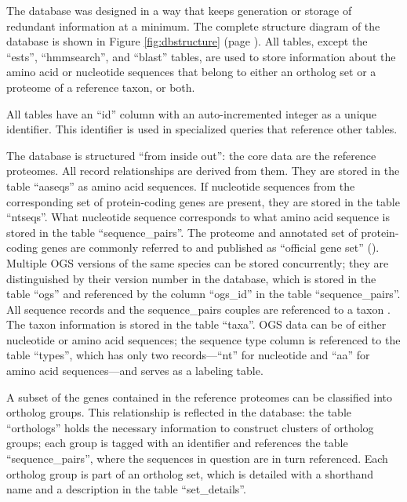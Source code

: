 \label{sec:database-structure}
The database was designed in a way that keeps
generation or storage of redundant information at a minimum. The complete
structure diagram of the database is shown in Figure \ref{fig:dbstructure} (page
\pageref{fig:dbstructure}). All tables, except the ``ests'', ``hmmsearch'', and
``blast'' tables, are used to store information about the amino acid or
nucleotide sequences that belong to either an ortholog set or a proteome of a
reference taxon, or both. 

All tables have an ``id'' column with an auto-incremented integer as a unique
identifier. This identifier is used in specialized queries that reference other
tables. 

The database is structured ``from inside out'': the core data are the reference
proteomes. All record relationships are derived from them. They are stored in
the table ``aaseqs'' as amino acid sequences. If nucleotide sequences from the
corresponding set of protein-coding genes are present, they are stored in the
table ``ntseqs''. What nucleotide sequence corresponds to what amino acid
sequence is stored in the table ``sequence\_pairs''. The proteome and annotated
set of protein-coding genes are commonly referred to and published as ``official
gene set'' ().  Multiple OGS versions of
the same species can be stored concurrently; they are distinguished by their
version number in the database, which is stored in the table ``ogs'' and
referenced by the column ``ogs\_id'' in the table ``sequence\_pairs''.  All
sequence records and the sequence\_pairs couples are referenced to a taxon
. The taxon information is stored in the table
``taxa''.  OGS data can be of either nucleotide or amino acid sequences; the
sequence type column is referenced to the table ``types'', which has only two
records---``nt'' for nucleotide and ``aa'' for amino acid sequences---and serves
as a labeling table.

A subset of the genes contained in the reference proteomes can be classified
into ortholog groups. This relationship is reflected in the database: the table
``orthologs'' holds the necessary information to construct clusters of ortholog
groups; each group is tagged with an identifier and references the table
``sequence\_pairs'', where the sequences in question are in turn referenced.
Each ortholog group is part of an ortholog set, which is detailed with a
shorthand name and a description in the table ``set\_details''.

